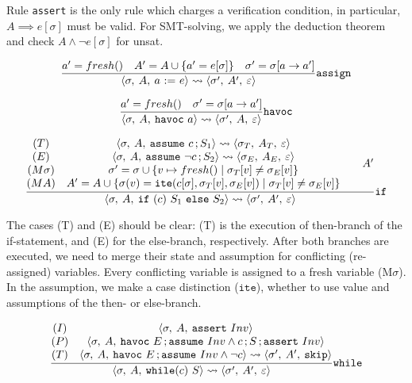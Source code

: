\documentclass[a4paper]{article}
\DeclareMathOperator{\semi}{;}
\begin{document}
Rule \texttt{assert} is the only rule which charges a verification condition, in
particular, $A \implies e[\sigma]$ must be valid. For SMT-solving, we apply the
deduction theorem and check $A \wedge \neg e[\sigma]$ for unsat.

\begin{equation}
  \label{ex:1}
  \frac%
  {
    a'=fresh()
    \quad
    A' = A \cup \{a' = e[\sigma]\}
    \quad
    \sigma' = \sigma[a \to a']
  }%
  {
    \config\sigma A{a~\mathtt{:=}~e}
    \leadsto
    \config{\sigma'}{A'}{\epsilon}
  }\mathtt{assign}
\end{equation}

\begin{equation}
  \label{ex:1}
  \frac%
  {
    a'=fresh()
    \quad
    \sigma' = \sigma[a \to a']
  }%
  {
    \config\sigma A{\mathtt{havoc}~a}
    \leadsto
    \config{\sigma'}{A}{\epsilon}
  }\mathtt{havoc}
\end{equation}

\begin{equation}
  \label{ex:1}
  \frac%
  {
    \begin{matrix}
      (T) & \config\sigma A{\mathtt{assume}~c\semi S_1} \leadsto \config{\sigma_T}{A_T}{\epsilon}\\
      (E) & \config\sigma A{\mathtt{assume}~\neg c\semi S_2}\leadsto \config{\sigma_E}{A_E}{\epsilon}\\
      (M\sigma)& \sigma' = \sigma \cup \{ v \mapsto fresh() \mid \sigma_T[v] \neq \sigma_E[v] \}\\
      (MA)& A' = A \cup \{  \sigma(v) = \mathtt{ite}(c[\sigma],  \sigma_T[v], \sigma_E[v])   \mid \sigma_T[v] \neq \sigma_E[v]  \}
    \end{matrix}
    \quad
    \quad
    A'
  }%
  {
    \config\sigma A{\mathtt{if}~(c)~S_1~\mathtt{else}~S_2}
    \leadsto
    \config{\sigma'}{A'}{\epsilon}
  }\mathtt{if}
\end{equation}

The cases (T) and (E) should be clear: (T) is the execution of then-branch of
the if-statement, and (E) for the else-branch, respectively. After both branches
are executed, we need to merge their state and assumption for conflicting
(re-assigned) variables. Every conflicting variable is assigned to a fresh
variable (M$\sigma$). In the assumption, we make a case distinction
($\mathtt{ite}$), whether to use value and assumptions of the then- or
else-branch.

\begin{equation}
  \label{ex:1}
  \frac%
  {
    \begin{matrix}
      (I) &\config{\sigma}{A%
      }{\mathtt{assert}~Inv}\\
      (P) &\config{\sigma}{A}{\mathtt{havoc}~E\semi\mathtt{assume}~Inv\land
        c\semi S\semi\mathtt{assert}~Inv}\\
      (T) &\config{\sigma}{A}{\mathtt{havoc}~E\semi\mathtt{assume}~Inv\land\neg
        c} \leadsto \config{\sigma'}{A'}{\mathtt{skip}}
    \end{matrix}
  }%
  {
    \config\sigma A{\mathtt{while}(c)~S}
    \leadsto
    \config{\sigma'}{A'}{\epsilon}
  }\mathtt{while}
\end{equation}
\end{document}
